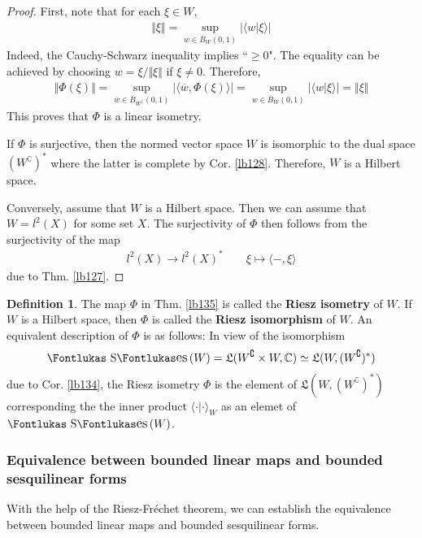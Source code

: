 \documentclass[12pt,b5paper,notitlepage]{article}
\theoremstyle{definition}
\newtheorem{df}{Definition}[section]
\theoremstyle{plain}
\DeclareMathOperator{\Ses}{\text{\Fontlukas S}\text{\kern -0pt {\Fontlukas\large es}}\,}
\newcommand{\fk}{\mathfrak}
\newcommand{\ovl}{\overline}
\newcommand{\bk}[1]{\langle {#1}\rangle}
\newcommand{\Co}{\complement}
\newcommand{\Cbb}{\mathbb C}
\numberwithin{equation}{section}
\begin{document}
\begin{proof}
First, note that for each $\xi\in W$,
\begin{align}
\Vert\xi\Vert=\sup_{w\in\ovl B_W(0,1)}|\bk{w|\xi}|
\end{align}
Indeed, the Cauchy-Schwarz inequality implies ``$\geq0$". The equality can be achieved by choosing $w=\xi/\Vert\xi\Vert$ if $\xi\neq0$. Therefore,
\begin{align*}
\Vert\Phi(\xi)\Vert=\sup_{\ovl w\in\ovl B_{W^\Co}(0,1)}|\bk{\ovl w,\Phi(\xi)}|=\sup_{w\in\ovl B_W(0,1)}|\bk{w|\xi}|=\Vert\xi\Vert
\end{align*}
This proves that $\Phi$ is a linear isometry.

If $\Phi$ is surjective, then the normed vector space $W$ is isomorphic to the dual space $(W^\Co)^*$ where the latter is complete by Cor. \ref{lb128}. Therefore, $W$ is a Hilbert space.

Conversely, assume that $W$ is a Hilbert space. Then we can assume that $W=l^2(X)$ for some set $X$. The surjectivity of $\Phi$ then follows from the surjectivity of the map
\begin{align*}
l^2(X)\rightarrow l^2(X)^*\qquad \xi\mapsto \bk{-,\xi}
\end{align*}
due to Thm. \ref{lb127}.
\end{proof}


\begin{df}
The map $\Phi$ in Thm. \ref{lb135} is called the \textbf{Riesz isometry} of $W$. If $W$ is a Hilbert space, then $\Phi$ is called the \textbf{Riesz isomorphism} of $W$.  An equivalent description of $\Phi$ is as follows: In view of the isomorphism
\begin{align*}
\Ses(W)=\fk L(W^\Co\times W,\Cbb)\simeq\fk L(W,(W^\Co)^*)
\end{align*}
due to Cor. \ref{lb134}, the Riesz isometry $\Phi$ is the element of $\fk L(W,(W^\Co)^*)$ corresponding the the inner product $\bk{\cdot|\cdot}_W$ as an elemet of $\Ses(W)$.
\end{df}


\subsubsection{Equivalence between bounded linear maps and bounded sesquilinear forms}






With the help of the Riesz-Fr\'echet theorem, we can establish the equivalence between bounded linear maps and bounded sesquilinear forms.
\end{document}
